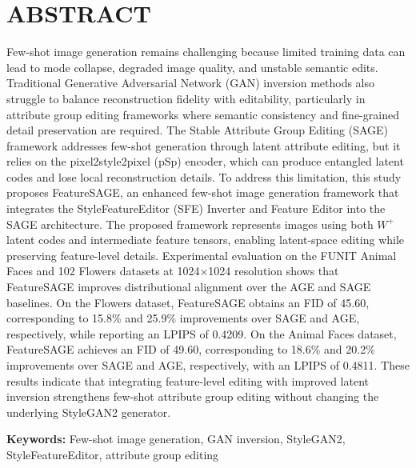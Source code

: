 \chapter*{ABSTRACT}

\begin{singlespace}
Few-shot image generation remains challenging because limited training data can lead to mode collapse, degraded image quality, and unstable semantic edits. Traditional Generative Adversarial Network (GAN) inversion methods also struggle to balance reconstruction fidelity with editability, particularly in attribute group editing frameworks where semantic consistency and fine-grained detail preservation are required. The Stable Attribute Group Editing (SAGE) framework addresses few-shot generation through latent attribute editing, but it relies on the pixel2style2pixel (pSp) encoder, which can produce entangled latent codes and lose local reconstruction details. To address this limitation, this study proposes FeatureSAGE, an enhanced few-shot image generation framework that integrates the StyleFeatureEditor (SFE) Inverter and Feature Editor into the SAGE architecture. The proposed framework represents images using both $W^{+}$ latent codes and intermediate feature tensors, enabling latent-space editing while preserving feature-level details. Experimental evaluation on the FUNIT Animal Faces and 102 Flowers datasets at 1024$\times$1024 resolution shows that FeatureSAGE improves distributional alignment over the AGE and SAGE baselines. On the Flowers dataset, FeatureSAGE obtains an FID of 45.60, corresponding to 15.8\% and 25.9\% improvements over SAGE and AGE, respectively, while reporting an LPIPS of 0.4209. On the Animal Faces dataset, FeatureSAGE achieves an FID of 49.60, corresponding to 18.6\% and 20.2\% improvements over SAGE and AGE, respectively, with an LPIPS of 0.4811. These results indicate that integrating feature-level editing with improved latent inversion strengthens few-shot attribute group editing without changing the underlying StyleGAN2 generator.

\vspace{1em}
\noindent\textbf{Keywords:} Few-shot image generation, GAN inversion, StyleGAN2, StyleFeatureEditor, attribute group editing
\end{singlespace}
